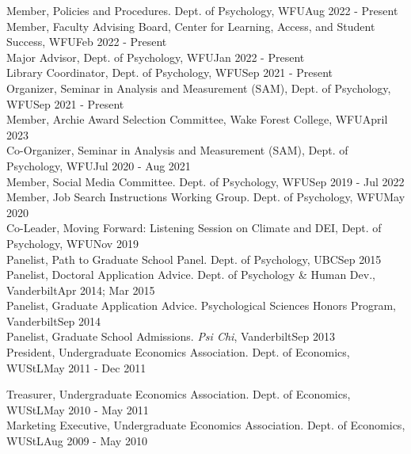 Member, Policies and Procedures. Dept. of Psychology, WFU\hfill {Aug 2022 - Present}\smallskip\\
Member, Faculty Advising Board, Center for Learning, Access, and Student Success, WFU\hfill {Feb 2022 - Present}\smallskip\\
Major Advisor, Dept. of Psychology, WFU\hfill {Jan 2022 - Present}\smallskip\\
Library Coordinator, Dept. of Psychology, WFU\hfill {Sep 2021 - Present}\smallskip\\
Organizer, Seminar in Analysis and Measurement (SAM), Dept. of Psychology, WFU\hfill {Sep 2021 - Present}\smallskip\\
Member, Archie Award Selection Committee, Wake Forest College, WFU\hfill{April 2023}\smallskip\\ 
Co-Organizer, Seminar in Analysis and Measurement (SAM), Dept. of Psychology, WFU\hfill {Jul 2020 - Aug 2021}\smallskip\\
Member, Social Media Committee. Dept. of Psychology, WFU\hfill {Sep 2019 - Jul 2022}\smallskip\\
Member, Job Search Instructions Working Group. Dept. of Psychology, WFU\hfill{May 2020}\smallskip\\
Co-Leader, Moving Forward: Listening Session on Climate and DEI, Dept. of Psychology, WFU\hfill {Nov 2019}\smallskip\\
Panelist, Path to Graduate School Panel. Dept. of Psychology, UBC\hfill {Sep 2015}\smallskip\\
Panelist, Doctoral Application Advice. Dept. of Psychology \& Human Dev., Vanderbilt\hfill {Apr 2014; Mar 2015}\smallskip\\
Panelist, Graduate Application Advice. Psychological Sciences Honors Program, Vanderbilt\hfill {Sep 2014}\smallskip\\
Panelist, Graduate School Admissions. \textit{Psi Chi}, Vanderbilt\hfill{Sep 2013}\smallskip\\
President, Undergraduate Economics Association. Dept. of Economics, WUStL\hfill{May 2011 - Dec 2011}\smallskip\\
\begin{minipage}{\linewidth}\vspace{1.1mm} Treasurer, Undergraduate Economics Association. Dept. of Economics, WUStL\hfill{May 2010 - May 2011}\smallskip\\
Marketing Executive, Undergraduate Economics Association. Dept. of Economics, WUStL\hfill {Aug 2009 - May 2010}\end{minipage}\medskip\\
